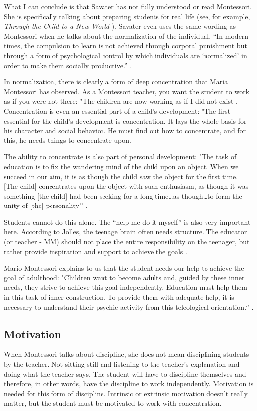 \documentclass[12pt, a4paper]{article}
\begin{document}
What I can conclude is that Savater has not fully understood or read Montessori. She is specifically talking about preparing students for real life (see, for example, \emph{Through the Child to a New World} \cite[]{Montessori1954}). Savater even uses the same wording as Montessori when he talks about the normalization of the individual. “In modern times, the compulsion to learn is not achieved through corporal punishment but through a form of psychological control by which individuals are ‘normalized’ in order to make them socially productive.” \cite[p.95]{savater}.

In normalization, there is clearly a form of deep concentration that Maria Montessori has observed. As a Montessori teacher, you want the student to work as if you were not there: "The children are now working as if I did not exist \cite[p.257]{Montessori2016}. Concentration is even an essential part of a child’s development: "The first essential for the child’s development is concentration. It lays the whole basis for his character and social behavior. He must find out how to concentrate, and for this, he needs things to concentrate upon. \cite[p. 201]{Montessori2016}

The ability to concentrate is also part of personal development: "The task of education is to fix the wandering mind of the child upon an object. When we succeed in our aim, it is as though the child saw the object for the first time. [The child] concentrates upon the object with such enthusiasm, as though it was something [the child] had been seeking for a long time…as though…to form the unity of [the] personality’’ \cite[Montessori quoted, p.105]{Lillard}.

Students cannot do this alone. The “help me do it myself” is also very important here. According to Jolles, the teenage brain often needs structure. The educator (or teacher - MM) should not place the entire responsibility on the teenager, but rather provide inspiration and support to achieve the goals \cite[p.167]{jolles}.

Mario Montessori explains to us that the student needs our help to achieve the goal of adulthood: "Children want to become adults and, guided by these inner needs, they strive to achieve this goal independently. Education must help them in this task of inner construction. To provide them with adequate help, it is necessary to understand their psychic activity from this teleological orientation.‘’ \cite[p. 60]{Mario}.

\subsection{Motivation}
When Montessori talks about discipline, she does not mean disciplining students by the teacher. Not sitting still and listening to the teacher's explanation and doing what the teacher says. The student will have to discipline themselves and therefore, in other words, have the discipline to work independently. Motivation is needed for this form of discipline. Intrinsic or extrinsic motivation doesn't really matter, but the student must be motivated to work with concentration.
\end{document}

